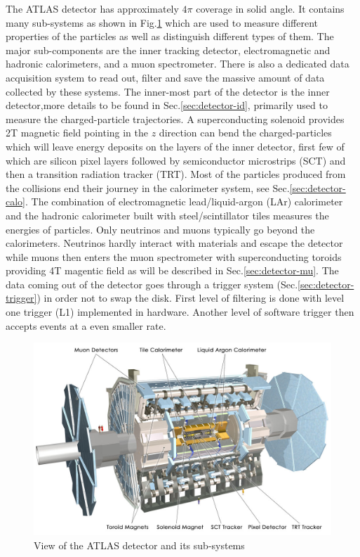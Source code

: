 The ATLAS detector has approximately $4\pi$ coverage in solid angle. It contains many sub-systems as shown in Fig.\ref{fig:detector-atlas} which are used to measure different properties of the particles as well as distinguish different types of them. The major sub-components are the inner tracking detector, electromagnetic and hadronic calorimeters, and a muon spectrometer. There is also a dedicated data acquisition system to read out, filter and save the massive amount of data collected by these systems. The inner-most part of the detector is the inner detector,more details to be found in Sec.\ref{sec:detector-id}, primarily used to measure the charged-particle trajectories. A superconducting solenoid provides 2T magnetic field pointing in the $z$ direction can bend the charged-particles which will leave energy deposits on the layers of the inner detector, first few of which are silicon pixel layers followed by semiconductor microstrips (SCT) and then a transition radiation tracker (TRT). Most of the particles produced from the collisions end their journey in the calorimeter system, see Sec.\ref{sec:detector-calo}. The combination of electromagnetic lead/liquid-argon (LAr) calorimeter and the hadronic calorimeter built with steel/scintillator tiles measures the energies of particles. Only neutrinos and muons typically go beyond the calorimeters. Neutrinos hardly interact with materials and escape the detector while muons then enters the muon spectrometer with superconducting toroids providing 4T magentic field as will be described in Sec.\ref{sec:detector-mu}. The data coming out of the detector goes through a trigger system (Sec.\ref{sec:detector-trigger}) in order not to swap the disk. First level of filtering is done with level one trigger (L1) implemented in hardware. Another level of software trigger then accepts events at a even smaller rate. 


\begin{figure}[htpb!]
\begin{center}
  \includegraphics[width=0.85\linewidth]{figures/detector/ATLAS_Silver_White_MK}
\caption{View of the ATLAS detector and its sub-systems}
\label{fig:detector-atlas}
\end{center}
\end{figure}


